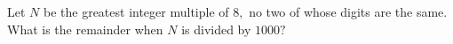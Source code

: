 Let $N$ be the greatest integer multiple of $8,$ no two of whose digits are the same. What is the remainder when $N$ is divided by $1000?$